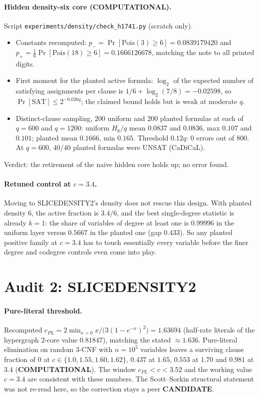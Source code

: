 \documentclass[11pt]{article}
\begin{document}
\paragraph{Hidden density-six core (COMPUTATIONAL).} Script \texttt{experiments/density/check\_h1741.py} (scratch only).
\begin{itemize}
\item Constants recomputed: $p_-=\Pr[\mathrm{Pois}(3)\ge6]=0.0839179420$ and $p_+=\tfrac16\Pr[\mathrm{Pois}(18)\ge6]=0.1666126678$, matching the note to all printed digits.
\item First moment for the planted active formula: $\log_2$ of the expected number of satisfying assignments per clause is $1/6+\log_2(7/8)=-0.02598$, so $\Pr[\mathrm{SAT}]\le2^{-0.026q}$; the claimed bound holds but is weak at moderate $q$.
\item Distinct-clause sampling, $200$ uniform and $200$ planted formulas at each of $q=600$ and $q=1200$: uniform $H_6/q$ mean $0.0837$ and $0.0836$, max $0.107$ and $0.101$; planted mean $0.1666$, min $0.165$. Threshold $0.12q$: $0$ errors out of $800$. At $q=600$, $40/40$ planted formulas were UNSAT (CaDiCaL).
\end{itemize}
Verdict: the retirement of the naive hidden core holds up; no error found.

\paragraph{Retuned control at $c=3.4$.} Moving to SLICEDENSITY2's density does not rescue this design. With planted density $6$, the active fraction is $3.4/6$, and the best single-degree statistic is already $k=1$: the share of variables of degree at least one is $0.99996$ in the uniform layer versus $0.5667$ in the planted one (gap $0.433$). So any planted positive family at $c=3.4$ has to touch essentially every variable before the finer degree and codegree controls even come into play.

\section*{Audit 2: SLICEDENSITY2}
\paragraph{Pure-literal threshold.} Recomputed $c_{PL}=2\min_{x>0}x/\bigl(3(1-e^{-x})^2\bigr)=1.63694$ (half-rate literals of the hypergraph 2-core value $0.81847$), matching the stated $\approx1.636$.
Pure-literal elimination on random 3-CNF with $n=10^5$ variables leaves a surviving clause fraction of $0$ at $c\in\{1.0,1.55,1.60,1.62\}$, $0.437$ at $1.65$, $0.553$ at $1.70$ and $0.981$ at $3.4$ (\textbf{COMPUTATIONAL}).
The window $c_{PL}<c<3.52$ and the working value $c=3.4$ are consistent with these numbers. The Scott--Sorkin structural statement was not re-read here, so the correction stays a peer \textbf{CANDIDATE}.
\end{document}
